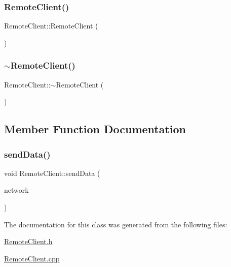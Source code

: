 \subsubsection{\texorpdfstring{Remote\+Client()}{RemoteClient()}}
{\footnotesize\ttfamily Remote\+Client\+::\+Remote\+Client (\begin{DoxyParamCaption}{ }\end{DoxyParamCaption})}

\mbox{\label{class_remote_client_a87d5a85c578795507d3bf2471e7c183f}} 
\subsubsection{\texorpdfstring{$\sim$\+Remote\+Client()}{~RemoteClient()}}
{\footnotesize\ttfamily Remote\+Client\+::$\sim$\+Remote\+Client (\begin{DoxyParamCaption}\item[{void}]{ }\end{DoxyParamCaption})}



\subsection{Member Function Documentation}
\mbox{\label{class_remote_client_af16d324aebfc6e2ed5718bbcb0f78e24}} 
\subsubsection{\texorpdfstring{send\+Data()}{sendData()}}
{\footnotesize\ttfamily void Remote\+Client\+::send\+Data (\begin{DoxyParamCaption}\item[{\mbox{\hyperlink{class_client_network}{Client\+Network}} $\ast$}]{network }\end{DoxyParamCaption})}



The documentation for this class was generated from the following files\+:\begin{DoxyCompactItemize}
\item 
\mbox{\hyperlink{_remote_client_8h}{Remote\+Client.\+h}}\item 
\mbox{\hyperlink{_remote_client_8cpp}{Remote\+Client.\+cpp}}\end{DoxyCompactItemize}
